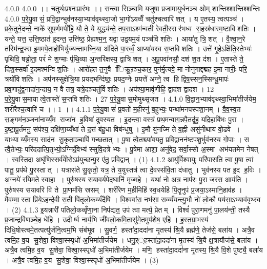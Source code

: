 \setcounter{anuvakam}{0}4.0.0
4.0.0
।। चतुर्थःप्रश्नःप्रारंभः ।। सन्त्वा सिञ्चामि यजुषा प्रजामायुर्धनञ्च ओम् शान्तिश्शान्तिश्शन्तिः
4.0.0
प॒रे॒यु॒वासं॒ प्रवि॒द्वान्भुव॑नस्या॒भ्याव॑वृथ्स्वा॒जो भा॒गो॑ऽयव्वैँ चतु॑श्चत्वारिशत् । य ए॒तस्य॒ त्वत्पञ्च॑ । प्रके॒तुने॒दन्ते॒ नाके॑ सुप॒र्णमपी॑हि॒ यौ ते॒ ये युद्ध्य॑न्ते॒ तप॒साऽश्म॑न्वती रेवती॒स्सर॑भध्व स॒हस्र॑धारम॒ष्टावि॑शतिः । यन्ते॒ यत्त॒ उत्ति॒ष्ठात॑ इ॒दन्त॒ उत्ति॑ष्ठ॒ प्रेह्यश्म॒न्॒ यद्वा उद्व॒यम॒यं पञ्च॑विशतिः । आया॑तु त्रि॒॒शत् । वै॒श्वा॒न॒रे तस्मि॑न्द्र॒फ्स इ॒ममपे॒ताहो॑भिर्युज्यन्तामघ्नि॒या अ॑दिते पा॒रव्वँ॒ आप्या॑यस्व स॒प्तवि॑शतिः । उत्ते॑ गृ॒हेऽक्षि॑ति॒स्तेभ्यः॑ पृथिवि॒ षड्ढो॑ता॒ परं॑ मे श॒ग्माः पृ॑थि॒व्या अ॒न्तरि॑क्षस्य॒ द्वात्रि॑शत् । अ॒पू॒पवा॑नसौ॒ दश॑ श॒त द॑श । ए॒तास्ते॑ ते॒ दिश॒स्सर्वा॑ इ॒दमश्म॑न्विश॒तिः । आरो॑हत त॒नुवै ििक्रू॒ऱञ्च॒कार॒ पुन॑र्मृ॒त्यवे॒ मा नोनु॑गाद्दद्मह इ॒मा नारीः॒ परि॒ त्रयो॑विशतिः । अप॑नस्सुक्षेत्रि॒या प्रयद्भन्दि॑ष्ठः॒ प्रयद॒ग्नेः प्रयत्ते॑ अग्ने॒ त्व हि द्विष॒स्सन॒स्सिन्धु॒मापः॑ प्रव॒णादु॑द्व॒नादा॑न॒न्दाय॒ न वै तत्र॒ यत्रे॒दञ्चतु॑र्विशतिः । अप॑श्या॒मावृ॑णीहि॒ द्वाद॑श द्वादश । 12 प॒रे॒यु॒वास॒मायात्वे॒तास्ते॑ स॒प्तवि॑शतिः । 27 प॒रे॒यु॒वास॒मोमुथ्सृ॒जत ।
4.1.0
वि॒द्वान॒भ्याव॑वृथ्स्वा॒भिमा॑तीर्जयेम॒ शरी॑रैश्च॒त्वारि॑ च ।। 1 ।।
4.1.1
प॒रे॒यु॒वासं॑ प्र॒वतो॑ म॒हीरनु॑ ब॒हुभ्यः॒ पन्था॑मनपस्पशा॒नम् । वै॒व॒स्व॒त स॒ङ्गम॑न॒ञ्जना॑नाय्यँ॒म राजा॑न ह॒विषा॑ दुवस्यत । इ॒दन्त्वा॒ वस्त्रं॑ प्रथ॒मन्वाग॒न्नपै॒तदू॑ह॒ यदि॒हाबि॑भः पु॒रा । इ॒ष्टा॒पू॒र्तमनु॒ संप॑श्य॒ दक्षि॑णा॒य्यँथा॑ ते द॒त्तं ब॑हु॒धा विब॑न्धुषु । इ॒मौ यु॑नज्मि ते व॒ह्नी असु॑नीथाय वो॒ढवे । याभ्याय्यँ॒मस्य॒ साद॑न सु॒कृता॒ञ्चापि॑ गच्छतात् । पू॒षा त्वे॒तश्च्या॑वयतु॒ प्रवि॒द्वानन॑ष्टपशु॒र्भुव॑नस्य गो॒पाः । स त्वै॒तेभ्यः॒ परि॑ददात्पि॒तृभ्यो॒ऽग्निर्दे॒वेभ्य॑ स्सुवि॒दत्रेभ्यः । पू॒षेमा आशा॒ अनु॑वेद॒ सर्वा॒स्सो अ॒स्मा अभ॑यतमेन नेषत् । स्व॒स्ति॒दा अघृ॑णि॒स्सर्व॑वी॒रोऽप्र॑युच्छन्पु॒र ए॑तु॒ प्रवि॒द्वान् । (1)
4.1.2
आयु॑र्वि॒श्वायुः॒ परि॑पासति त्वा पू॒षा त्वा॑ पातु॒ प्रप॑थे पु॒रस्तात् । यत्रास॑ते सु॒कृतो॒ यत्र॒ ते य॒युस्तत्र॑ त्वा दे॒वस्स॑वि॒ता द॑धातु । भुव॑नस्य पत इ॒द ह॒विः । अ॒ग्नये॑ रयि॒मते॒ स्वाहा । पुरु॑षस्य सयाव॒र्यपेद॒घानि॑ मृज्महे । यथा॑ नो॒ अत्र॒ नाप॑रः पु॒रा ज॒रस॒ आय॑ति । पुरु॑षस्य सयावरि वि ते प्रा॒णम॑सि स्रसम् । शरी॑रेण म॒हीमिहि॑ स्व॒धयेहि॑ पि॒तॄनुप॑ प्र॒जया॒ऽस्मानि॒हाव॑ह । मैव॑म्मा॒स्ता प्रि॑ये॒ऽहन्दे॒वी स॒ती पि॑तृलो॒कय्यँदैषि॑ । वि॒श्ववा॑रा॒ नभ॑सा॒ सव्व्यँ॑यन्त्यु॒भौ नो॑ लो॒कौ पय॑सा॒ऽभ्याव॑वृथ्स्व । (2)
4.1.3
इ॒यन्नारी॑ पतिलो॒कव्वृँणा॒ना निप॑द्यत॒ उप॑ त्वा मर्त्य॒ प्रेतम् । विश्वं॑ पुरा॒णमनु॑ पा॒लय॑न्ती॒ तस्यै प्र॒जान्द्रवि॑णञ्चे॒ह धे॑हि । उदीर्ष्व नार्य॒भि जी॑वलो॒कमि॒तासु॑मे॒तमुप॑शेष॒ एहि॑ । ह॒स्त॒ग्रा॒भस्य॑ दिधि॒षोस्त्वमे॒तत्पत्यु॑र्जनि॒त्वम॒भि संब॑भूव । सु॒वर्ण॒॒ हस्ता॑दा॒ददा॑ना मृ॒तस्य॑ श्रि॒यै ब्रह्म॑णे॒ तेज॑से॒ बला॑य । अत्रै॒व त्वमि॒ह व॒य सु॒शेवा॒ विश्वा॒स्स्पृधो॑ अ॒भिमा॑तीर्जयेम । धनु॒ऱ््हस्ता॑दा॒ददा॑ना मृ॒तस्य॑ श्रि॒यै क्ष॒त्रायौज॑से॒ बला॑य । अत्रै॒व त्वमि॒ह व॒य सु॒शेवा॒ विश्वा॒स्स्पृधो॑ अ॒भिमा॑तीर्जयेम । मणि॒॒ हस्ता॑दा॒ददा॑ना मृ॒तस्य॒ श्रि॒यै वि॒शे पुष्ट्यै॒ बला॑य । अत्रै॒व त्वमि॒ह व॒य सु॒शेवा॒ विश्वा॒स्स्पृधो॑ अ॒भिमा॑तीर्जयेम । (3)
